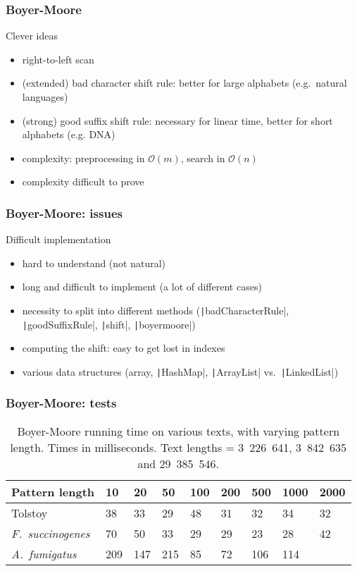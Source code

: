\documentclass{beamer}
\begin{document}
\begin{frame}
  \frametitle{Boyer-Moore}

  \begin{block}{Clever ideas}
    \begin{itemize}
    \item right-to-left scan
    \item (extended) bad character shift rule: better for large
      alphabets (e.g.\ natural languages)
    \item (strong) good suffix shift rule: necessary for linear time,
      better for short alphabets (e.g. DNA)
    \item complexity: preprocessing in $\mathcal{O}(m)$, search in
      $\mathcal{O}(n)$
    \item complexity difficult to prove
    \end{itemize}
  \end{block}
\end{frame}

\begin{frame}
  \frametitle{Boyer-Moore: issues}

  \begin{block}{Difficult implementation}
    \begin{itemize}
    \item hard to understand (not natural)
    \item long and difficult to implement (a lot of different cases)
    \item necessity to split into different methods
      (\texttt|badCharacterRule|,
      \texttt|goodSuffixRule|, \texttt|shift|,
      \texttt|boyermoore|)
    \item computing the shift: easy to get lost in indexes
    \item various data structures (array, \texttt|HashMap|,
      \texttt|ArrayList| vs.\ \texttt|LinkedList|)
    \end{itemize}
  \end{block}
\end{frame}

\begin{frame}
  \frametitle{Boyer-Moore: tests}

  \begin{table}[ht]
    \centering
    \begin{tabular}{lllllllll}
      \toprule[1pt]
      Pattern length & 10 & 20 & 50 & 100 & 200 & 500 & 1000 & 2000 \\
      \midrule
      Tolstoy & 38 & 33 & 29 & 48 & 31 & 32 & 34 & 32 \\
      \emph{F.\ succinogenes} & 70 & 50 & 33 & 29 & 29 & 23 & 28 & 42 \\
      \emph{A.\ fumigatus} & 209 & 147 & 215 & 85 & 72 & 106 & 114 & \\
      \bottomrule[1pt]
    \end{tabular}
    \caption{Boyer-Moore running time on various texts, with varying pattern length. Times in milliseconds. Text lengths = 3~226~641, 3~842~635 and 29~385~546.}
  \end{table}
\end{frame}
\end{document}
